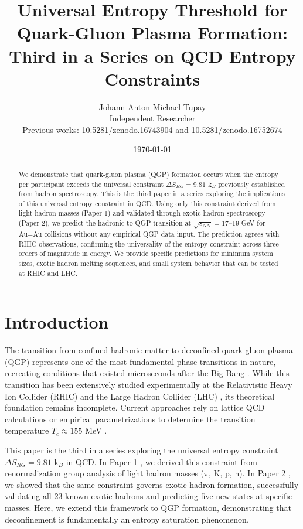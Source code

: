 \documentclass[12pt,a4paper]{article}
\title{Universal Entropy Threshold for Quark-Gluon Plasma Formation:\\
Third in a Series on QCD Entropy Constraints}
\author{Johann Anton Michael Tupay\\
\small{Independent Researcher}\\
\small{Previous works: \href{https://zenodo.org/records/16743904}{10.5281/zenodo.16743904} 
and \href{https://zenodo.org/records/16752674}{10.5281/zenodo.16752674}}}
\date{\today}
\begin{document}
\maketitle

\begin{abstract}
We demonstrate that quark-gluon plasma (QGP) formation occurs when the entropy per participant exceeds the universal constraint $\Delta S_{RG} = 9.81$ k$_B$ previously established from hadron spectroscopy. This is the third paper in a series exploring the implications of this universal entropy constraint in QCD. Using only this constraint derived from light hadron masses (Paper 1) and validated through exotic hadron spectroscopy (Paper 2), we predict the hadronic to QGP transition at $\sqrt{s_{NN}} = 17$--19 GeV for Au+Au collisions without any empirical QGP data input. The prediction agrees with RHIC observations, confirming the universality of the entropy constraint across three orders of magnitude in energy. We provide specific predictions for minimum system sizes, exotic hadron melting sequences, and small system behavior that can be tested at RHIC and LHC.
\end{abstract}

\section{Introduction}

The transition from confined hadronic matter to deconfined quark-gluon plasma (QGP) represents one of the most fundamental phase transitions in nature, recreating conditions that existed microseconds after the Big Bang \cite{Shuryak2004,Muller2012}. While this transition has been extensively studied experimentally at the Relativistic Heavy Ion Collider (RHIC) \cite{STAR2005,PHENIX2005,BRAHMS2005,PHOBOS2005} and the Large Hadron Collider (LHC) \cite{ALICE2011,CMS2012,ATLAS2013}, its theoretical foundation remains incomplete. Current approaches rely on lattice QCD calculations \cite{Borsanyi2014,HotQCD2014,Bazavov2017} or empirical parametrizations to determine the transition temperature $T_c \approx 155$ MeV \cite{Andronic2018}.

This paper is the third in a series exploring the universal entropy constraint $\Delta S_{RG} = 9.81$ k$_B$ in QCD. In Paper 1 \cite{Paper1}, we derived this constraint from renormalization group analysis of light hadron masses ($\pi$, K, p, n). In Paper 2 \cite{Paper2}, we showed that the same constraint governs exotic hadron formation, successfully validating all 23 known exotic hadrons and predicting five new states at specific masses. Here, we extend this framework to QGP formation, demonstrating that deconfinement is fundamentally an entropy saturation phenomenon.
\end{document}
